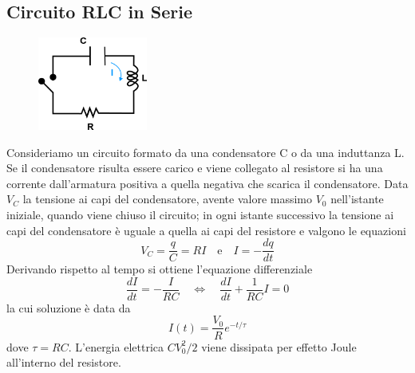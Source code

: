 \subsection{Circuito RLC in Serie}
\begin{figure} %
    \centering
    \includegraphics[width=0.32\textwidth]{images/RLC} %
\end{figure}
Consideriamo un circuito formato da una condensatore C o da una induttanza L. Se il condensatore risulta essere carico e viene collegato al resistore si ha una corrente dall'armatura positiva a quella negativa che scarica il condensatore. Data $V_C$ la tensione ai capi del condensatore, avente valore massimo $V_0$ nell'istante iniziale, quando viene chiuso il circuito; in ogni istante successivo la tensione ai capi del condensatore \`e uguale a quella ai capi del resistore e valgono le equazioni 
\begin{equation*}
	V_C = \frac{q}{C} = RI \quad \text{e} \quad I = - \frac{dq}{dt}
\end{equation*}  
Derivando rispetto al tempo si ottiene l'equazione differenziale  
\begin{equation*}
	\frac{dI}{dt} = - \frac{I}{RC} \quad \iff \quad  \frac{dI}{dt} + \frac{1}{RC}I = 0
\end{equation*}
la cui soluzione \`e data da
\begin{equation*}
	I(t) = \frac{V_0}{R} e^{- t/\tau}
\end{equation*}
dove $\tau =RC$. L'energia elettrica $CV_0^2/2$ viene dissipata per effetto Joule all'interno del resistore.
\newline

